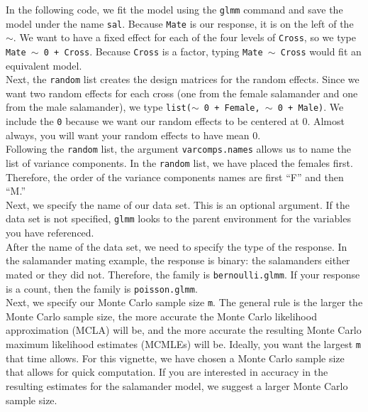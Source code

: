 \documentclass[article]{jss}
\begin{document}
In the following code, we  fit the model using the \texttt{glmm} command and save the model under the name  \texttt{sal}. Because \texttt{Mate} is our response, it is on the left of the $\sim$. We want to have a fixed effect for each of the four levels of \texttt{Cross}, so we type \texttt{Mate $\sim$ 0 + Cross}. Because \texttt{Cross} is a factor, typing \texttt{Mate $\sim$ Cross} would fit an equivalent model. \\ 

Next, the \texttt{random} list creates the design matrices for the random effects. Since we want two random effects for each cross (one from the female salamander and one from the male salamander), we type \texttt{list($\sim$ 0 + Female, $\sim$ 0 + Male)}. We  include the \texttt{0} because we want our random effects to be centered at 0. Almost always, you will want your random effects to have mean 0. \\

 Following the \texttt{random} list, the argument \texttt{varcomps.names} allows us to name the list of variance components. In the \texttt{random} list, we have placed the females first. Therefore, the order of the variance components names are first ``F'' and then ``M.''  \\

Next,  we specify the name of our data set. This is an optional argument. If the data set is not specified, \texttt{glmm} looks to the parent environment for the variables you have referenced. \\

After the name of the data set, we need to specify the type of the response. In the salamander mating example, the response is binary: the salamanders either mated or they did not. Therefore, the family is \texttt{bernoulli.glmm}. If your response is a count, then the family is \texttt{poisson.glmm}.\\

Next, we specify our Monte Carlo sample size \texttt{m}. The general rule is the larger the Monte Carlo sample size, the more accurate the Monte Carlo likelihood approximation (MCLA) will be, and the more accurate the resulting Monte Carlo maximum likelihood estimates (MCMLEs) will be. Ideally, you want the largest \texttt{m} that time allows. For this vignette, we have chosen a Monte Carlo sample size that allows for quick computation. If you are interested in accuracy in the resulting estimates for the salamander model, we suggest a larger Monte Carlo sample size.  \\
\end{document}
